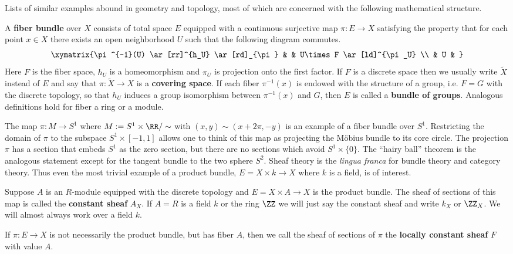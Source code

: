 Lists of similar examples abound in geometry and topology, most of which are concerned with the following mathematical structure.

\begin{defn}\label{defn:fiber_bundle}
A \textbf{fiber bundle} over $X$ consists of total space $E$ equipped with a continuous surjective map $\pi:E\to X$ satisfying the property that for each point $x\in X$ there exists an open neighborhood $U$ such that the following diagram commutes.
\[
\xymatrix{\pi^{-1}(U) \ar[rr]^{h_U} \ar[rd]_{\pi} & & U\times F \ar[ld]^{\pi_U} \\ & U & } 
\]
Here $F$ is the fiber space, $h_U$ is a homeomorphism and $\pi_U$ is projection onto the first factor. If $F$ is a discrete space then we usually write $\tilde{X}$ instead of $E$ and say that $\pi:\tilde{X}\to X$ is a \textbf{covering space}. If each fiber $\pi^{-1}(x)$ is endowed with the structure of a group, i.e. $F=G$ with the discrete topology, so that $h_U$ induces a group isomorphism between $\pi^{-1}(x)$ and $G$, then $E$ is called a \textbf{bundle of groups}. Analogous definitions hold for fiber a ring or a module.
\end{defn}

The map $\pi:M\to S^1$ where $M:=S^1\times \RR/\sim$ with $(x,y)\sim (x+2\pi,-y)$ is an example of a fiber bundle over $S^1$. Restricting the domain of $\pi$ to the subspace $S^1\times [-1,1]$ allows one to think of this map as projecting the M\"obius bundle to its core circle. The projection $\pi$ has a section that embeds $S^1$ as the zero section, but there are no sections which avoid $S^1\times\{0\}$. The ``hairy ball'' theorem is the analogous statement except for the tangent bundle to the two sphere $S^2$. Sheaf theory is the \emph{lingua franca} for bundle theory and category theory. Thus even the most trivial example of a product bundle, $E=X\times k\to X$ where $k$ is a field, is of interest.

\begin{defn}\label{defn:const_sheaf}
	Suppose $A$ is an $R$-module equipped with the discrete topology and $E=X\times A\to X$ is the product bundle. The sheaf of sections of this map is called the \textbf{constant sheaf} $A_X$. If $A=R$ is a field $k$ or the ring $\ZZ$ we will just say the constant sheaf and write $k_X$ or $\ZZ_X$. We will almost always work over a field $k$.
	
	If $\pi:E\to X$ is not necessarily the product bundle, but has fiber $A$, then we call the sheaf of sections of $\pi$ the \textbf{locally constant sheaf} $F$ with value $A$.  
\end{defn}

